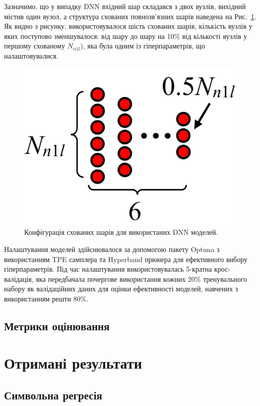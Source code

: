 \documentclass[10pt,a5paper,titlepage,oneside]{book}
\numberwithin{equation}{part}
\begin{document}
Зазначимо, що у випадку DNN вхідний шар складався з двох вузлів, вихідний містив один вузол,
а структура схованих повнозв'язних шарів наведена на Рис.~\ref{figDNN}.
Як видно з рисунку, використовувалося шість схованих шарів, кількість вузлів у яких поступово зменшувалося:
від шару до шару на 10\% від кількості вузлів у першому схованому $N_{n1l}$), яка була одним із гіперпараметрів, що налаштовувалися.


\begin{figure}
	\centering
     \includegraphics[width=0.6\linewidth]{Fig22.png}
	  \caption{Конфігурація схованих шарів для використаних DNN моделей.
}\label{figDNN}
\end{figure}

Налаштування моделей здійснювалося за допомогою пакету Optuna \cite{Akiba2019} з використанням TPE самплера та Hyperband прюнера
для ефективного вибору гіперпараметрів.
Під час налаштування використовувалась 5-кратна крос-валідація, яка передбачала почергове використання кожних 20\% тренувального набору
як валідаційних даних для оцінки ефективності моделей, навчених з використанням решти 80\%.




%
%
%



\section{Метрики оцінювання}

\chapter{Отримані результати}

\section{Символьна регресія}
\end{document}
